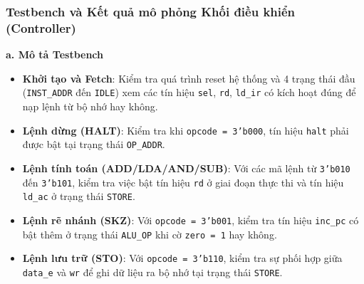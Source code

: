 \subsubsection{Testbench và Kết quả mô phỏng Khối điều khiển (Controller)}

\textbf{a. Mô tả Testbench} \\
\begin{itemize}
    \item \textbf{Khởi tạo và Fetch}: Kiểm tra quá trình reset hệ thống  và 4 trạng thái đầu (\texttt{INST\_ADDR} đến \texttt{IDLE}) xem các tín hiệu \texttt{sel}, \texttt{rd}, \texttt{ld\_ir} có kích hoạt đúng để nạp lệnh từ bộ nhớ hay không.
    \item \textbf{Lệnh dừng (HALT)}: Kiểm tra khi \texttt{opcode = 3'b000}, tín hiệu \texttt{halt} phải được bật tại trạng thái \texttt{OP\_ADDR}.
    \item \textbf{Lệnh tính toán (ADD/LDA/AND/SUB)}: Với các mã lệnh từ \texttt{3'b010} đến \texttt{3'b101}, kiểm tra việc bật tín hiệu \texttt{rd} ở giai đoạn thực thi và tín hiệu \texttt{ld\_ac} ở trạng thái \texttt{STORE}.
    \item \textbf{Lệnh rẽ nhánh (SKZ)}: Với \texttt{opcode = 3'b001}, kiểm tra tín hiệu \texttt{inc\_pc} có bật thêm ở trạng thái \texttt{ALU\_OP} khi cờ \texttt{zero = 1} hay không.
    \item \textbf{Lệnh lưu trữ (STO)}: Với \texttt{opcode = 3'b110}, kiểm tra sự phối hợp giữa \texttt{data\_e} và \texttt{wr} để ghi dữ liệu ra bộ nhớ tại trạng thái \texttt{STORE}.
\end{itemize}

